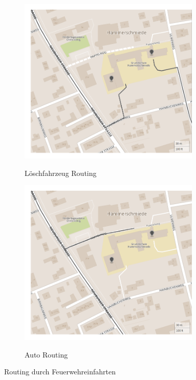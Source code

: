 \begin{figure}[htb]
\centering
\begin{subfigure}{0.49\textwidth}
\centering
\includegraphics[width = 0.95\textwidth]{../media/schoolfire.png} \\
\caption{Löschfahrzeug Routing}
\label{fig:schoolfire}
\end{subfigure}
\begin{subfigure}{0.49\textwidth}
\centering
\includegraphics[width = 0.95\textwidth]{../media/schoolcar.png} \\
\caption{Auto Routing}
\label{fig:schoolcar}
\end{subfigure}
\caption{Routing durch Feuerwehreinfahrten}
\label{fig:school}
\end{figure}

